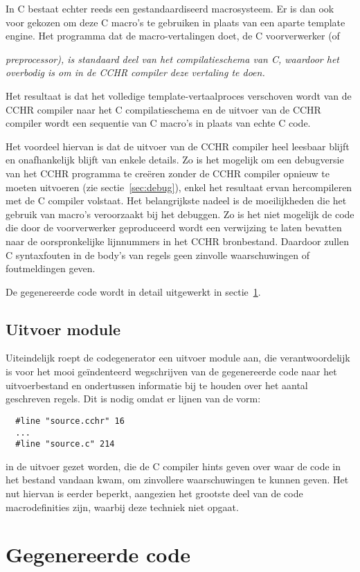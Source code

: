 In C bestaat echter reeds een gestandaardiseerd macrosysteem. Er is dan ook voor gekozen om deze C macro's te gebruiken in plaats van een aparte template engine. Het programma dat de macro-vertalingen doet, de C voorverwerker (of {\em preprocessor), is standaard deel van het compilatieschema van C, waardoor het overbodig is om in de CCHR compiler deze vertaling te doen.

Het resultaat is dat het volledige template-vertaalproces verschoven wordt van de CCHR compiler naar het C compilatieschema en de uitvoer van de CCHR compiler wordt een sequentie van C macro's in plaats van echte C code.

Het voordeel hiervan is dat de uitvoer van de CCHR compiler heel leesbaar blijft en onafhankelijk blijft van enkele details. Zo is het mogelijk om een debugversie van het CCHR programma te cre\"eren zonder de CCHR compiler opnieuw te moeten uitvoeren (zie sectie~\ref{sec:debug}), enkel het resultaat ervan hercompileren met de C compiler volstaat. Het belangrijkste nadeel is de moeilijkheden die het gebruik van macro's veroorzaakt bij het debuggen. Zo is het niet mogelijk de code die door de voorverwerker geproduceerd wordt een verwijzing te laten bevatten naar de oorspronkelijke lijnnummers in het CCHR bronbestand. Daardoor zullen C syntaxfouten in de body's van regels geen zinvolle waarschuwingen of foutmeldingen geven.

De gegenereerde code wordt in detail uitgewerkt in sectie~\ref{sec:gencode}.

\subsection{Uitvoer module} \label{sec:uitvoer}

Uiteindelijk roept de codegenerator een uitvoer module aan, die verantwoordelijk is voor het mooi ge\"indenteerd wegschrijven van de gegenereerde code naar het uitvoerbestand en ondertussen informatie bij te houden over het aantal geschreven regels. Dit is nodig omdat er lijnen van de vorm: \begin{Verbatim}
  #line "source.cchr" 16
  ...
  #line "source.c" 214
\end{Verbatim}
in de uitvoer gezet worden, die de C compiler hints geven over waar de code in het bestand vandaan kwam, om zinvollere waarschuwingen te kunnen geven. Het nut hiervan is eerder beperkt, aangezien het grootste deel van de code macrodefinities zijn, waarbij deze techniek niet opgaat.

\section{Gegenereerde code} \label{sec:gencode}

}
